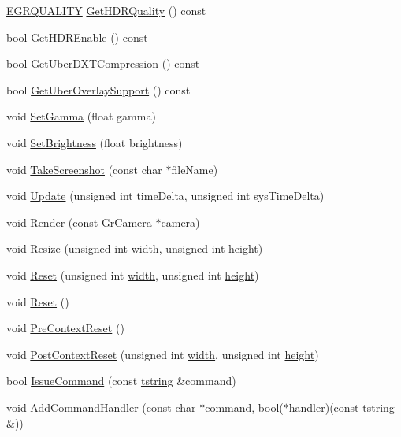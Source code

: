 \begin{CompactItemize}
\item 
\hyperlink{enums_8h_697c1ee1354746841860d5bf9f81c033}{EGRQUALITY} \hyperlink{class_gr_subsys_4cdb145baf1da08648bb3148793556e9}{GetHDRQuality} () const 
\item 
bool \hyperlink{class_gr_subsys_7729f2d94ac04a53a95086298b1dfef5}{GetHDREnable} () const 
\item 
bool \hyperlink{class_gr_subsys_8550cea92945ba8f93d6fdbdaf6ee6bf}{GetUberDXTCompression} () const 
\item 
bool \hyperlink{class_gr_subsys_3cfcbb972dde87822c868363146bf7ee}{GetUberOverlaySupport} () const 
\item 
void \hyperlink{class_gr_subsys_f53962ed44cf2234adf5e07b301adcc0}{SetGamma} (float gamma)
\item 
void \hyperlink{class_gr_subsys_f22032c84937955ff0e23eb8b3632379}{SetBrightness} (float brightness)
\item 
void \hyperlink{class_gr_subsys_fef54c85657d029366011e1731c5f71e}{TakeScreenshot} (const char $\ast$fileName)
\item 
void \hyperlink{class_gr_subsys_9881b11bf389779155d144a2a78d6dd2}{Update} (unsigned int timeDelta, unsigned int sysTimeDelta)
\item 
void \hyperlink{class_gr_subsys_d20bc13ebade4221323d63b2925a9d00}{Render} (const \hyperlink{class_gr_camera}{GrCamera} $\ast$camera)
\item 
void \hyperlink{class_gr_subsys_9522c885154f2fe8daa62cb8f48529ed}{Resize} (unsigned int \hyperlink{wglext_8h_e6531b1788ca42a9ae8155b0c52e7630}{width}, unsigned int \hyperlink{wglext_8h_b2e63df950c3789599e1e43f477bc9e3}{height})
\item 
void \hyperlink{class_gr_subsys_155c0e49f8e45159abf4df5359eb8d6a}{Reset} (unsigned int \hyperlink{wglext_8h_e6531b1788ca42a9ae8155b0c52e7630}{width}, unsigned int \hyperlink{wglext_8h_b2e63df950c3789599e1e43f477bc9e3}{height})
\item 
void \hyperlink{class_gr_subsys_374bd75973d46d7e9fabcc280e505b22}{Reset} ()
\item 
void \hyperlink{class_gr_subsys_1e99ac2bc9378e2170b3592327a368b5}{PreContextReset} ()
\item 
void \hyperlink{class_gr_subsys_dc45431cc61c9b21ff173c7f8bd1f578}{PostContextReset} (unsigned int \hyperlink{wglext_8h_e6531b1788ca42a9ae8155b0c52e7630}{width}, unsigned int \hyperlink{wglext_8h_b2e63df950c3789599e1e43f477bc9e3}{height})
\item 
bool \hyperlink{class_gr_subsys_2ae640ed8f7efaa789b10091e33ab5a3}{IssueCommand} (const \hyperlink{common__afx_8h_816fa58fd77499b0edb2c69ebe803d5c}{tstring} \&command)
\item 
void \hyperlink{class_gr_subsys_8f2ca0d3463ad8e1c921b3d21a7f9e6e}{AddCommandHandler} (const char $\ast$command, bool($\ast$handler)(const \hyperlink{common__afx_8h_816fa58fd77499b0edb2c69ebe803d5c}{tstring} \&))
\end{CompactItemize}


